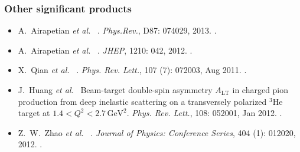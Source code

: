 \documentclass[11pt,letterpaper]{article}
\newcommand{\etal}{\textit{et al.}}
\begin{document}
\subsubsection*{Other significant products}
\begin{itemize}
 \setlength{\itemsep}{0pt}
 \setlength{\parskip}{0pt}
 \setlength{\parsep}{0pt}
 \item A.~Airapetian \etal~
  .
  \newblock \emph{Phys.Rev.}, D87: 074029, 2013.
  \cite{PhysRevD.87.074029}.
 \item A.~Airapetian \etal~
  .
  \newblock \emph{JHEP}, 1210: 042, 2012.
  \cite{Airapetian:2012pg}.
 \item X.~Qian \etal~
  .
  \newblock \emph{Phys. Rev. Lett.}, 107 (7): 072003, Aug 2011.
  \cite{PhysRevLett.107.072003}.
 \item J.~Huang \etal~
  \newblock Beam-target double-spin asymmetry ${A}_{\mathrm{LT}}$ in charged pion production from deep inelastic scattering on a transversely polarized $^{3}\mathrm{He}$ target at $1.4 < {Q}^{2} < 2.7\,{\mathrm{GeV}}^{2}$.
  \newblock \emph{Phys. Rev. Lett.}, 108: 052001, Jan 2012.
  \cite{PhysRevLett.108.052001}.
 \item Z.~W.~Zhao \etal~
  .
  \newblock \emph{Journal of Physics: Conference Series}, 404 (1): 012020, 2012.
  \cite{1742-6596-404-1-012020}.
\end{itemize}

\end{document}
